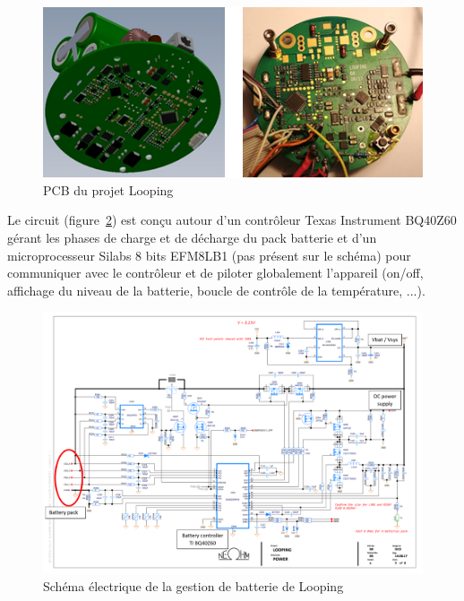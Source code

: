 \documentclass[a4paper, 12pt, sffamily]{report}
\begin{document}
\begin{figure}[H]
\centering
\includegraphics[scale=1]{figures/photos/looping_pcb.jpg}
\caption{PCB du projet Looping}
\label{fig:looping_pcb}
\end{figure}

Le circuit (figure~\ref{fig:looping_charger}) est conçu autour d'un contrôleur Texas Instrument BQ40Z60 gérant les phases de charge et de décharge du pack batterie et d'un microprocesseur Silabs 8 bits EFM8LB1 (pas présent sur le schéma) pour communiquer avec le contrôleur et de piloter globalement l'appareil (on/off, affichage du niveau de la batterie, boucle de contrôle de la température, ...).

\begin{figure}[h]
\centering
\includegraphics[scale=0.6]{figures/screenshots/battery_charger.png}
\caption{Schéma électrique de la gestion de batterie de Looping}
\label{fig:looping_charger}
\end{figure}
\end{document}
